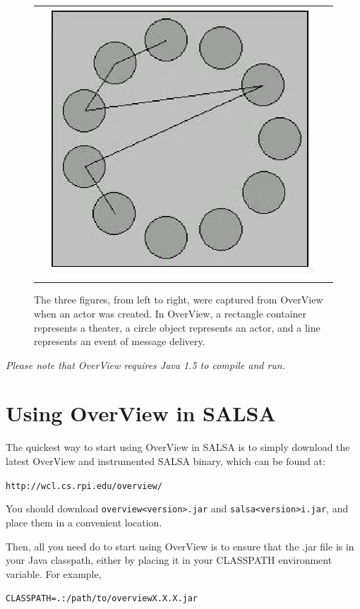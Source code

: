 \begin{figure}
\begin{tabular}{lll}
&
\includegraphics[angle=0,scale=0.3]{heatavi3.eps}
\\
\end{tabular}
\caption{The three figures, from left to right, were captured from OverView when an actor was created.
In OverView, a rectangle container represents a theater, a circle object represents an actor,
and a line represents an event of message delivery.}
\label{heatExample}
\end{figure}

\emph{Please note that OverView requires Java 1.5 to compile and run.}

\section{Using OverView in SALSA}
The quickest way to start using OverView in SALSA is to simply download the
latest OverView and instrumented SALSA binary, which can be found at:
\begin{description}
  \item {\tt http://wcl.cs.rpi.edu/overview/}
\end{description}

You should download {\tt overview<version>.jar} and {\tt salsa<version>i.jar}, and 
place them in a convenient location.

Then, all you need do to start using OverView is to ensure that the .jar file is 
in your Java classpath, either by placing it in your CLASSPATH environment variable. For example, 
\begin{description}
  \item {\tt CLASSPATH=.:/path/to/overviewX.X.X.jar }
\end{description}

